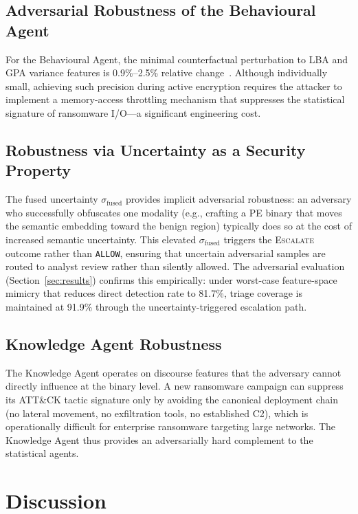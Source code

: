 \documentclass[journal]{IEEEtran}
\begin{document}
\subsection{Adversarial Robustness of the Behavioural Agent}
For the Behavioural Agent, the minimal counterfactual perturbation
to LBA and GPA variance features is 0.9\%--2.5\% relative
change~\cite{kabuye2026sabre}.
Although individually small, achieving such precision during active
encryption requires the attacker to implement a memory-access
throttling mechanism that suppresses the statistical signature of
ransomware I/O---a significant engineering cost.

\subsection{Robustness via Uncertainty as a Security Property}
The fused uncertainty $\sigma_{\mathrm{fused}}$ provides implicit adversarial
robustness: an adversary who successfully obfuscates one modality
(e.g., crafting a PE binary that moves the semantic embedding toward
the benign region) typically does so at the cost of increased
semantic uncertainty.
This elevated $\sigma_{\mathrm{fused}}$ triggers the \textsc{Escalate} outcome
rather than \texttt{ALLOW}, ensuring that uncertain adversarial samples are
routed to analyst review rather than silently allowed.
The adversarial evaluation (Section~\ref{sec:results}) confirms this
empirically: under worst-case feature-space mimicry that reduces direct
detection rate to 81.7\%, triage coverage is maintained at 91.9\% through the
uncertainty-triggered escalation path.

\subsection{Knowledge Agent Robustness}
The Knowledge Agent operates on discourse features that the adversary
cannot directly influence at the binary level.
A new ransomware campaign can suppress its ATT\&CK tactic signature
only by avoiding the canonical deployment chain (no lateral movement,
no exfiltration tools, no established C2), which is operationally
difficult for enterprise ransomware targeting large networks.
The Knowledge Agent thus provides an adversarially hard complement
to the statistical agents.

\section{Discussion}
\label{sec:discussion}
\end{document}
